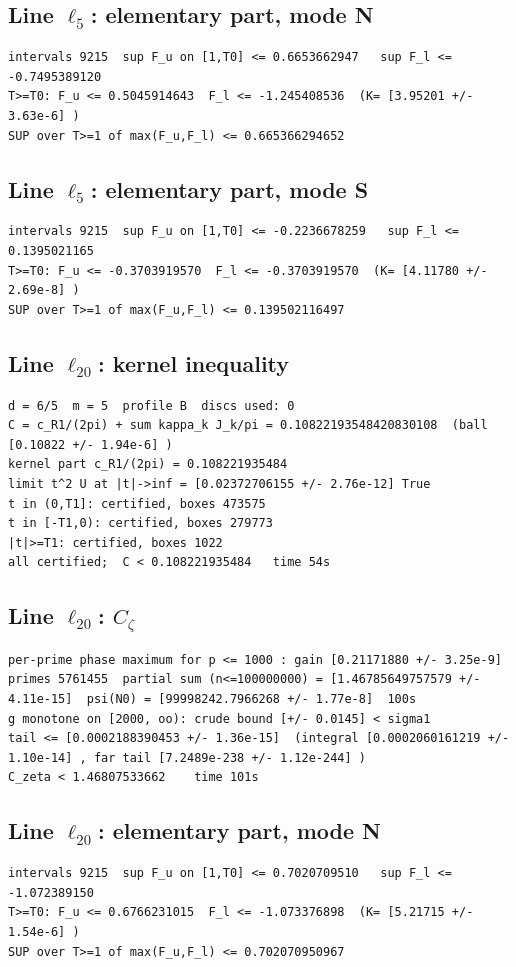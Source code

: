 \documentclass[11pt,reqno]{amsart}
\numberwithin{equation}{section}
\theoremstyle{definition}
\theoremstyle{remark}
\begin{document}
\subsection*{Line $\ell_{5}$: elementary part, mode N}
\begin{lstlisting}
intervals 9215  sup F_u on [1,T0] <= 0.6653662947   sup F_l <= -0.7495389120
T>=T0: F_u <= 0.5045914643  F_l <= -1.245408536  (K= [3.95201 +/- 3.63e-6] )
SUP over T>=1 of max(F_u,F_l) <= 0.665366294652
\end{lstlisting}
\subsection*{Line $\ell_{5}$: elementary part, mode S}
\begin{lstlisting}
intervals 9215  sup F_u on [1,T0] <= -0.2236678259   sup F_l <= 0.1395021165
T>=T0: F_u <= -0.3703919570  F_l <= -0.3703919570  (K= [4.11780 +/- 2.69e-8] )
SUP over T>=1 of max(F_u,F_l) <= 0.139502116497
\end{lstlisting}
\subsection*{Line $\ell_{20}$: kernel inequality}
\begin{lstlisting}
d = 6/5  m = 5  profile B  discs used: 0
C = c_R1/(2pi) + sum kappa_k J_k/pi = 0.10822193548420830108  (ball [0.10822 +/- 1.94e-6] )
kernel part c_R1/(2pi) = 0.108221935484
limit t^2 U at |t|->inf = [0.02372706155 +/- 2.76e-12] True
t in (0,T1]: certified, boxes 473575
t in [-T1,0): certified, boxes 279773
|t|>=T1: certified, boxes 1022
all certified;  C < 0.108221935484   time 54s
\end{lstlisting}
\subsection*{Line $\ell_{20}$: $C_\zeta$}
\begin{lstlisting}
per-prime phase maximum for p <= 1000 : gain [0.21171880 +/- 3.25e-9]
primes 5761455  partial sum (n<=100000000) = [1.46785649757579 +/- 4.11e-15]  psi(N0) = [99998242.7966268 +/- 1.77e-8]  100s
g monotone on [2000, oo): crude bound [+/- 0.0145] < sigma1
tail <= [0.0002188390453 +/- 1.36e-15]  (integral [0.0002060161219 +/- 1.10e-14] , far tail [7.2489e-238 +/- 1.12e-244] )
C_zeta < 1.46807533662    time 101s
\end{lstlisting}
\subsection*{Line $\ell_{20}$: elementary part, mode N}
\begin{lstlisting}
intervals 9215  sup F_u on [1,T0] <= 0.7020709510   sup F_l <= -1.072389150
T>=T0: F_u <= 0.6766231015  F_l <= -1.073376898  (K= [5.21715 +/- 1.54e-6] )
SUP over T>=1 of max(F_u,F_l) <= 0.702070950967
\end{lstlisting}
\end{document}
